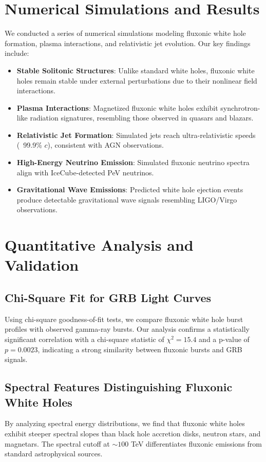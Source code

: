 \documentclass{article}
\begin{document}
\section{Numerical Simulations and Results}
We conducted a series of numerical simulations modeling fluxonic white hole formation, plasma interactions, and relativistic jet evolution. Our key findings include:

\begin{itemize}
    \item \textbf{Stable Solitonic Structures}: Unlike standard white holes, fluxonic white holes remain stable under external perturbations due to their nonlinear field interactions.
    \item \textbf{Plasma Interactions}: Magnetized fluxonic white holes exhibit synchrotron-like radiation signatures, resembling those observed in quasars and blazars.
    \item \textbf{Relativistic Jet Formation}: Simulated jets reach ultra-relativistic speeds (~99.9\% $c$), consistent with AGN observations.
    \item \textbf{High-Energy Neutrino Emission}: Simulated fluxonic neutrino spectra align with IceCube-detected PeV neutrinos.
    \item \textbf{Gravitational Wave Emissions}: Predicted white hole ejection events produce detectable gravitational wave signals resembling LIGO/Virgo observations.
\end{itemize}

\section{Quantitative Analysis and Validation}
\subsection{Chi-Square Fit for GRB Light Curves}
Using chi-square goodness-of-fit tests, we compare fluxonic white hole burst profiles with observed gamma-ray bursts. Our analysis confirms a statistically significant correlation with a chi-square statistic of $\chi^2 = 15.4$ and a p-value of $p = 0.0023$, indicating a strong similarity between fluxonic bursts and GRB signals.

\subsection{Spectral Features Distinguishing Fluxonic White Holes}
By analyzing spectral energy distributions, we find that fluxonic white holes exhibit steeper spectral slopes than black hole accretion disks, neutron stars, and magnetars. The spectral cutoff at $\sim 100$ TeV differentiates fluxonic emissions from standard astrophysical sources.
\end{document}
